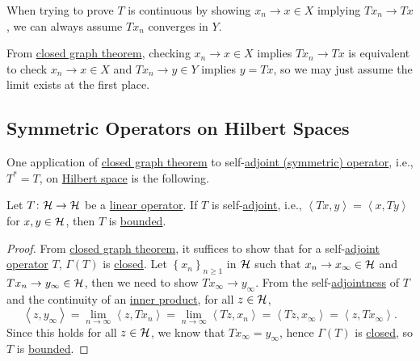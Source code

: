 \begin{remark}
	When trying to prove \(T\) is continuous by showing \(x_n \to x\in X\) implying \(Tx_n \to Tx\), we can always assume \(Tx_n\) converges in \(Y\).
\end{remark}
\begin{explanation}
	From \hyperref[thm:closed-graph]{closed graph theorem}, checking \(x_n \to x\in X\) implies \(Tx_n \to Tx\) is equivalent to check \(x_n \to x\in X\) and \(Tx_n \to y\in Y\) implies \(y = Tx\), so we may just assume the limit exists at the first place.
\end{explanation}

\subsection{Symmetric Operators on Hilbert Spaces}
One application of \hyperref[thm:closed-graph]{closed graph theorem} to self-\hyperref[def:adjoint-op]{adjoint (symmetric) operator}, i.e., \(T^{\ast} = T\), on \hyperref[def:Hilbert-space]{Hilbert space} is the following.

\begin{theorem}\label{thm:Hellinger-Toeplitz}
	Let \(T\colon \mathcal{\MakeUppercase{h}} \to \mathcal{\MakeUppercase{h}} \) be a \hyperref[def:linear-op]{linear operator}. If \(T\) is self-\hyperref[def:adjoint-op]{adjoint}, i.e., \(\left\langle Tx, y \right\rangle  = \left\langle x, Ty \right\rangle\) for \(x, y\in \mathcal{\MakeUppercase{h}} \), then \(T\) is \hyperref[rmk:bounded-op]{bounded}.
\end{theorem}
\begin{proof}
	From \hyperref[thm:closed-graph]{closed graph theorem}, it suffices to show that for a self-\hyperref[def:adjoint-op]{adjoint operator} \(T\), \(\Gamma (T)\) is \hyperref[def:closed-graph]{closed}. Let \(\left\{ x_n \right\} _{n\geq 1}\) in \(\mathcal{\MakeUppercase{h}} \) such that \(x_n \to x_\infty \in \mathcal{\MakeUppercase{h}} \) and \(Tx_n \to y_\infty \in\mathcal{\MakeUppercase{h}} \), then we need to show \(Tx_\infty \to y_\infty \). From the self-\hyperref[def:adjoint-op]{adjointness} of \(T\) and the continuity of an \hyperref[def:inner-product]{inner product}, for all \(z\in \mathcal{\MakeUppercase{h}} \),
	\[
		\left\langle z, y_\infty  \right\rangle = \lim\limits_{n \to \infty} \left\langle z, Tx_n \right\rangle = \lim\limits_{n \to \infty} \left\langle Tz, x_n \right\rangle = \left\langle Tz, x_\infty  \right\rangle = \left\langle z, Tx_\infty  \right\rangle.
	\]
	Since this holds for all \(z\in \mathcal{\MakeUppercase{h}} \), we know that \(Tx_\infty = y_\infty \), hence \(\Gamma (T)\) is \hyperref[def:closed-graph]{closed}, so \(T\) is \hyperref[rmk:bounded-op]{bounded}.
\end{proof}

